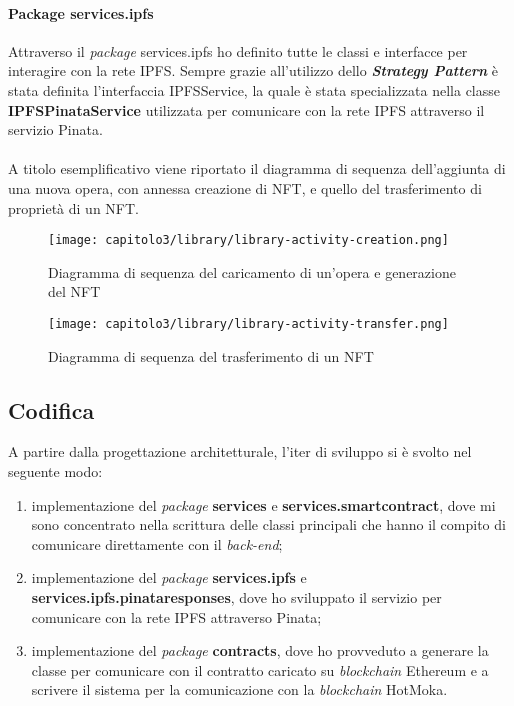 \paragraph{Package services.ipfs} Attraverso il \textit{package} services.ipfs ho definito tutte le classi e interfacce per interagire con la rete IPFS. Sempre grazie all'utilizzo dello \textit{\textbf{Strategy Pattern}} è stata definita l'interfaccia IPFSService, la quale è stata specializzata nella classe \textbf{IPFSPinataService} utilizzata per comunicare con la rete IPFS attraverso il servizio Pinata.

\paragraph{}

A titolo esemplificativo viene riportato il diagramma di sequenza dell'aggiunta di una nuova opera, con annessa creazione di NFT, e quello del trasferimento di proprietà di un NFT.

\begin{figure}[h!]
  \centering
  \texttt{[image: capitolo3/library/library-activity-creation.png]}
  \caption{Diagramma di sequenza del caricamento di un'opera e generazione del NFT}
\end{figure}

\begin{figure}[h!]
  \centering
  \texttt{[image: capitolo3/library/library-activity-transfer.png]}
  \caption{Diagramma di sequenza del trasferimento di un NFT}
\end{figure}

\subsection{Codifica}
A partire dalla progettazione architetturale, l'iter di sviluppo si è svolto nel seguente modo:
\begin{enumerate}
  \item implementazione del \textit{package} \textbf{services} e \textbf{services.smartcontract}, dove mi sono concentrato nella scrittura delle classi principali che hanno il compito di comunicare direttamente con il \textit{back-end};
  \item implementazione del \textit{package} \textbf{services.ipfs} e \textbf{services.ipfs.pinataresponses}, dove ho sviluppato il servizio per comunicare con la rete IPFS attraverso Pinata;
  \item implementazione del \textit{package} \textbf{contracts}, dove ho provveduto a generare la classe per comunicare con il contratto caricato su \textit{blockchain} Ethereum e a scrivere il sistema per la comunicazione con la \textit{blockchain} HotMoka.
\end{enumerate}

